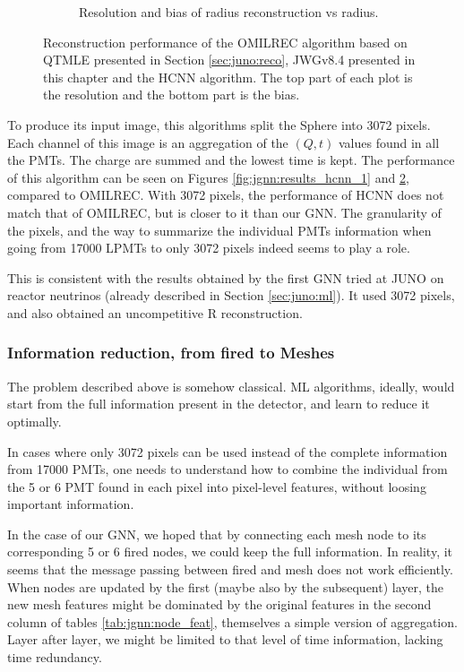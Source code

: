 \documentclass[../main.tex]{subfiles}
\begin{document}
\begin{figure}[ht]
\begin{subfigure}[t]{0.48\linewidth}
    \caption{Resolution and bias of radius reconstruction vs radius.}
    \label{fig:jgnn:MSBvRTC_hcnn}
  \end{subfigure}
  \caption{Reconstruction performance of the OMILREC algorithm based on QTMLE presented in Section \ref{sec:juno:reco}, JWGv8.4 presented in this chapter and the HCNN algorithm. The top part of each plot is the resolution and the bottom part is the bias.}
  \label{fig:jgnn:results_hcnn_2}
\end{figure}


To produce its input image, this algorithms split the Sphere into 3072 pixels. Each channel of this image is an aggregation of the $(Q, t)$ values found in all the PMTs. The charge are summed and the lowest time is kept. The performance of this algorithm can be seen on Figures \ref{fig:jgnn:results_hcnn_1} and \ref{fig:jgnn:results_hcnn_2}, compared to OMILREC. With 3072 pixels, the performance of HCNN does not match that of OMILREC, but is closer to it than our GNN. The granularity of the pixels, and the way to summarize the individual PMTs information when going from 17000 LPMTs to only 3072 pixels indeed seems to play a role.

This is consistent with the results obtained by the first GNN tried at JUNO on reactor neutrinos (already described in Section \ref{sec:juno:ml}).
It used 3072 pixels, and also obtained an uncompetitive R reconstruction.

\subsubsection{Information reduction, from fired to Meshes}

The problem described above is somehow classical. ML algorithms, ideally, would start from the full information present in the detector, and learn to reduce it optimally.

In cases where only 3072 pixels can be used instead of the complete information from 17000 PMTs, one needs to understand how to combine the individual from the 5 or 6 PMT found in each pixel into pixel-level features, without loosing important information.

In the case of our GNN, we hoped that by connecting each mesh node to its corresponding 5 or 6 fired nodes, we could keep the full information. In reality, it seems that the message passing between fired and mesh does not work efficiently. When nodes are updated by the first (maybe also by the subsequent) layer, the new mesh features might be dominated by the original features in the second column of tables \ref{tab:jgnn:node_feat}, themselves a simple version of aggregation.
Layer after layer, we might be limited to that level of time information, lacking time redundancy.
\end{document}
